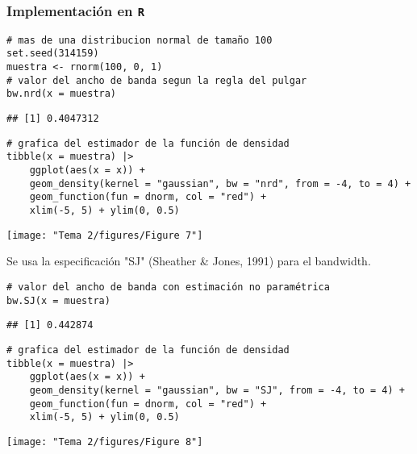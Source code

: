 \subsubsection*{Implementación en \textbf{\texttt{R}} }
\begin{lstlisting}
# mas de una distribucion normal de tamaño 100
set.seed(314159)
muestra <- rnorm(100, 0, 1)
# valor del ancho de banda segun la regla del pulgar
bw.nrd(x = muestra)
\end{lstlisting}
\begin{verbatim}
## [1] 0.4047312
\end{verbatim}
\begin{lstlisting}
# grafica del estimador de la función de densidad
tibble(x = muestra) |>
    ggplot(aes(x = x)) +
    geom_density(kernel = "gaussian", bw = "nrd", from = -4, to = 4) +
    geom_function(fun = dnorm, col = "red") +
    xlim(-5, 5) + ylim(0, 0.5)
\end{lstlisting}
\begin{center}
    \texttt{[image: "Tema 2/figures/Figure 7"]}
\end{center}
Se usa la especificación "SJ" (Sheather \& Jones, 1991) para el bandwidth.
\begin{lstlisting}
# valor del ancho de banda con estimación no paramétrica
bw.SJ(x = muestra)
\end{lstlisting}
\begin{verbatim}
## [1] 0.442874
\end{verbatim}
\begin{lstlisting}
# grafica del estimador de la función de densidad
tibble(x = muestra) |>
    ggplot(aes(x = x)) +
    geom_density(kernel = "gaussian", bw = "SJ", from = -4, to = 4) +
    geom_function(fun = dnorm, col = "red") + 
    xlim(-5, 5) + ylim(0, 0.5)
\end{lstlisting}
\begin{center}
    \texttt{[image: "Tema 2/figures/Figure 8"]}
\end{center}

